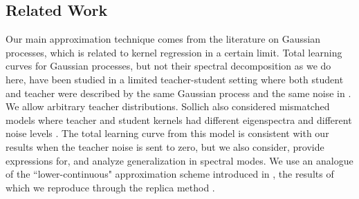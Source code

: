 \documentclass{article}
\newcommand{\cp}[1]{{\color{red} #1}}
\begin{document}
\subsection{Related Work}
Our main approximation technique comes from the literature on Gaussian processes, which is related to kernel regression in a certain limit. Total learning curves for Gaussian processes, but not their spectral decomposition as we do here, have been studied in a limited teacher-student setting where both student and teacher were described by the same Gaussian process and the same noise in  \cite{OpperVivarelli,sollich1999learning}.    %
We allow %
arbitrary teacher distributions. Sollich also considered mismatched models where teacher and student kernels had different eigenspectra and different noise levels \cite{sollich2001mismatch}. The total learning curve from this model is consistent with our results when the teacher noise is sent to zero, but we also consider, provide expressions for, and analyze generalization in spectral modes.  We use an analogue of the ``lower-continuous" approximation scheme introduced in \cite{sollich2002approx}, the results of which we reproduce through the replica method \cite{mezard1987spin}. 
\end{document}
